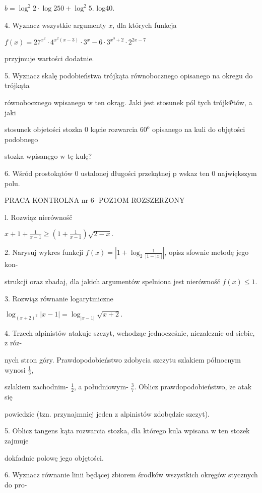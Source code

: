 \documentclass[a4paper,12pt]{article}
\begin{document}
$b=\log^{2}2\cdot\log 250+\log^{2}5$. log40.

4. Wyznacz wszystkie argumenty $x$, dla których funkcja

$f(x)=27^{x^{2}}\cdot 4^{x^{2}(x-3)}\cdot 3^{x}-6\cdot 3^{x^{3}+2}\cdot 2^{2x-7}$

przyjmuje wartości dodatnie.

5. Wyznacz skalę podobieństwa trójkąta równobocznego opisanego na okregu do trójkąta

równobocznego wpisanego $\mathrm{w}$ ten okrąg. Jaki jest stosunek pól tych trójk$\Phi$tów, a jaki

stosunek objetości stozka $0$ kącie rozwarcia $60^{\mathrm{o}}$ opisanego na kuli do objętości podobnego

stozka wpisanęgo $\mathrm{w}$ tę kulę?

6. Wśród prostokątów 0 ustalonej długości przekątnej p wskaz ten 0 największym polu.




PRACA KONTROLNA nr 6- POZ1OM ROZSZERZONY

l. Rozwiąz nierównośč

$x+1+\displaystyle \frac{1}{x-1}\geq(1+\frac{1}{x-1})\sqrt{2-x}.$

2. Narysuj wykres funkcji $f(x) = |1+ \displaystyle \log_{2}\frac{1}{|1-|x||}|$, opisz sfownie metodę jego kon-

strukcji oraz zbadaj, dla jakich argumentów spelniona jest nierównośč $f(x)\leq 1.$

3. Rozwiąz równanie logarytmiczne

$\log_{(x+2)^{2}}|x-1|=\log_{|x-1|}\sqrt{x+2}.$

4. Trzech alpinistów atakuje szczyt, wchodząc jednocześnie, niezaleznie od siebie, $\mathrm{z}$ róz-

nych stron góry. Prawdopodobieństwo zdobycia szczytu szlakiem północnym wynosi $\displaystyle \frac{1}{3},$

szlakiem zachodnim- $\displaystyle \frac{1}{2}$, a południowym- $\displaystyle \frac{3}{7}$. Oblicz prawdopodobieństwo, $\dot{\mathrm{z}}\mathrm{e}$ atak się

powiedzie (tzn. przynajmniej jeden $\mathrm{z}$ alpinistów zdobędzie szczyt).

5. Oblicz tangens kąta rozwarcia stozka, dla którego kula wpisana w ten stozek zajmuje

dokfadnie polowę jego objętości.

6. Wyznacz równanie linii będącej zbiorem środków wszystkich okręgów stycznych do pro-
\end{document}
